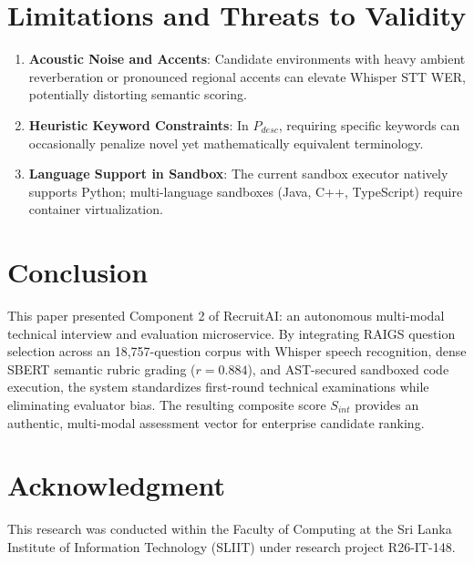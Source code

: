 \documentclass[conference]{IEEEtran}
\begin{document}
\section{Limitations and Threats to Validity}
\begin{enumerate}
    \item \textbf{Acoustic Noise and Accents}: Candidate environments with heavy ambient reverberation or pronounced regional accents can elevate Whisper STT WER, potentially distorting semantic scoring.
    \item \textbf{Heuristic Keyword Constraints}: In $P_{desc}$, requiring specific keywords can occasionally penalize novel yet mathematically equivalent terminology.
    \item \textbf{Language Support in Sandbox}: The current sandbox executor natively supports Python; multi-language sandboxes (Java, C++, TypeScript) require container virtualization.
\end{enumerate}

\section{Conclusion}
This paper presented Component 2 of RecruitAI: an autonomous multi-modal technical interview and evaluation microservice. By integrating RAIGS question selection across an 18,757-question corpus with Whisper speech recognition, dense SBERT semantic rubric grading ($r=0.884$), and AST-secured sandboxed code execution, the system standardizes first-round technical examinations while eliminating evaluator bias. The resulting composite score $S_{int}$ provides an authentic, multi-modal assessment vector for enterprise candidate ranking.

\section*{Acknowledgment}
This research was conducted within the Faculty of Computing at the Sri Lanka Institute of Information Technology (SLIIT) under research project R26-IT-148.



\end{document}
